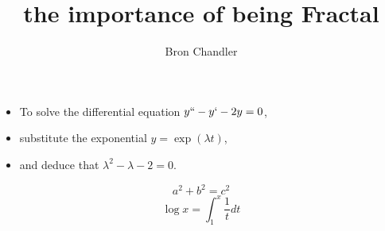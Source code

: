 \documentclass[12pt,a4paper]{article}
\begin{document}
\title{the importance of being Fractal}
\author{Bron Chandler}
\maketitle

\begin{itemize}
\item To solve the differential equation $y``-y`-2y=0$,
\item substitute the exponential $y=\exp(\lambda t)$,
\item and deduce that $\lambda^2-\lambda-2=0$.
\end{itemize}

\begin{displaymath}
 a^2+b^2=c^2
\end{displaymath}
\begin{equation}
 \log x=\int_1^x
 \frac{1}{t}dt
\end{equation}
\end{document}
